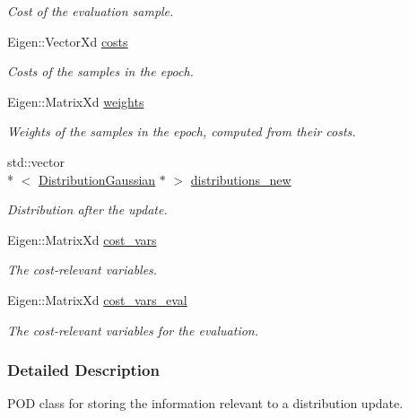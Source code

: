\begin{DoxyCompactItemize}
\begin{DoxyCompactList}\small\item\em Cost of the evaluation sample. \end{DoxyCompactList}\item 
Eigen\+::\+Vector\+Xd \hyperlink{classDmpBbo_1_1UpdateSummaryParallel_ac3b47ca8e32f8b5cdaa23bdd375ccfd3}{costs}
\begin{DoxyCompactList}\small\item\em Costs of the samples in the epoch. \end{DoxyCompactList}\item 
Eigen\+::\+Matrix\+Xd \hyperlink{classDmpBbo_1_1UpdateSummaryParallel_a16d226260adc0af72c89783c656d25d5}{weights}
\begin{DoxyCompactList}\small\item\em Weights of the samples in the epoch, computed from their costs. \end{DoxyCompactList}\item 
std\+::vector\\*
$<$ \hyperlink{classDmpBbo_1_1DistributionGaussian}{Distribution\+Gaussian} $\ast$ $>$ \hyperlink{classDmpBbo_1_1UpdateSummaryParallel_a4c6413f2fad88cc0c4addb3f2a2ef298}{distributions\+\_\+new}
\begin{DoxyCompactList}\small\item\em Distribution after the update. \end{DoxyCompactList}\item 
Eigen\+::\+Matrix\+Xd \hyperlink{classDmpBbo_1_1UpdateSummaryParallel_ab6057150915c96b1d20ed485a1f5ce18}{cost\+\_\+vars}
\begin{DoxyCompactList}\small\item\em The cost-\/relevant variables. \end{DoxyCompactList}\item 
Eigen\+::\+Matrix\+Xd \hyperlink{classDmpBbo_1_1UpdateSummaryParallel_a309e381520075afa088c97bf1e7e6cd0}{cost\+\_\+vars\+\_\+eval}
\begin{DoxyCompactList}\small\item\em The cost-\/relevant variables for the evaluation. \end{DoxyCompactList}\end{DoxyCompactItemize}


\subsubsection{Detailed Description}
P\+O\+D class for storing the information relevant to a distribution update. 

